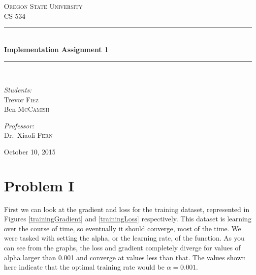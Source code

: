 \documentclass{article}
\newcommand{\HRule}{\rule{\linewidth}{0.5mm}}
\begin{document}
\begin{titlepage}
\begin{center}

\textsc{\LARGE Oregon State University}\\[1.5cm]

\textsc{\Large CS 534}\\[0.5cm]

\HRule \\[0.4cm]
{ \huge \bfseries Implementation Assignment 1\\[0.4cm] }

\HRule \\[1.5cm]

\noindent
\begin{minipage}{0.4\textwidth}
\begin{flushleft} \large
\emph{Students:}\\
Trevor \textsc{Fiez}\\
Ben \textsc{McCamish}
\end{flushleft}
\end{minipage}%
\begin{minipage}{0.4\textwidth}
\begin{flushright} \large
\emph{Professor:} \\
Dr.~Xiaoli \textsc{Fern}
\end{flushright}
\end{minipage}

\vfill

{\large October 10, 2015}

\end{center}
\end{titlepage}

\section*{Problem I}

First we can look at the gradient and loss for the training dataset, represented in Figures \ref{trainingGradient} and \ref{trainingLoss} respectively. This dataset is learning over the course of time, so eventually it should converge, most of the time. We were tasked with setting the alpha, or the learning rate, of the function. As you can see from the graphs, the loss and gradient completely diverge for values of alpha larger than 0.001 and converge at values less than that. The values shown here indicate that the optimal training rate would be $\alpha=0.001$. 
\end{document}
